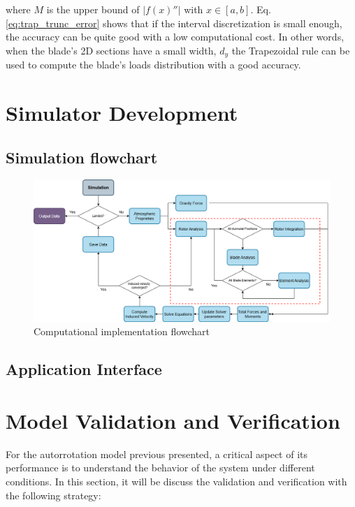 \noindent where $M$ is the upper bound of $|f(x)''|$ with $x \in \left[a, b\right]$. Eq. \ref{eq:trap_trunc_error} shows that if the interval discretization is small enough, the accuracy can be quite good with a low computational cost. In other words, when the blade's 2D sections have a small width, $d_y$ the Trapezoidal rule can be used to compute the blade's loads distribution with a good accuracy.

\section{Simulator Development}


\subsection{Simulation flowchart}
\label{sec:flow_chart}

\begin{figure}[!htb]
    \centering
    \includegraphics[width=\textwidth]{Figures/comp_method/simulation_flowchart.png}
    \caption{Computational implementation flowchart}
    \label{fig:flowchart}
\end{figure}

\subsection{Application Interface}
\label{sec:application_interface}

\section{Model Validation and Verification}
\label{sec:validation_verification}

For the autorrotation model previous presented, a critical aspect of its performance is to understand the behavior of the system under different conditions. In this section, it will be discuss the validation and verification with the following strategy:

